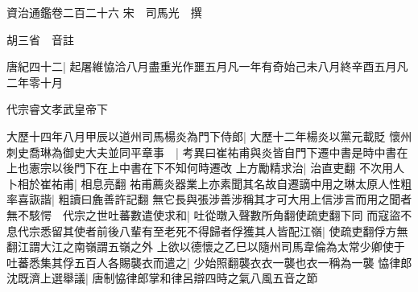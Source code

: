 資治通鑑卷二百二十六
宋　司馬光　撰

胡三省　音註

唐紀四十二|{
	起屠維恊洽八月盡重光作噩五月凡一年有奇始己未八月終辛酉五月凡二年零十月}


代宗睿文孝武皇帝下

大歷十四年八月甲辰以道州司馬楊炎為門下侍郎|{
	大歷十二年楊炎以黨元載貶}
懷州刺史喬琳為御史大夫並同平章事　|{
	考異曰崔祐甫與炎皆自門下遷中書是時中書在上也憲宗以後門下在上中書在下不知何時遷改}
上方勵精求治|{
	治直吏翻}
不次用人卜相於崔祐甫|{
	相息亮翻}
祐甫薦炎器業上亦素聞其名故自遷謫中用之琳太原人性粗率喜詼諧|{
	粗讀曰麁善許記翻}
無它長與張涉善涉稱其才可大用上信涉言而用之聞者無不駭愕　代宗之世吐蕃數遣使求和|{
	吐從暾入聲數所角翻使疏吏翻下同}
而寇盜不息代宗悉留其使者前後八輩有至老死不得歸者俘獲其人皆配江嶺|{
	使疏吏翻俘方無翻江謂大江之南嶺謂五嶺之外}
上欲以德懷之乙巳以隨州司馬韋倫為太常少卿使于吐蕃悉集其俘五百人各賜襲衣而遣之|{
	少始照翻襲衣衣一襲也衣一稱為一襲}
恊律郎沈既濟上選舉議|{
	唐制恊律郎掌和律呂辯四時之氣八風五音之節}


